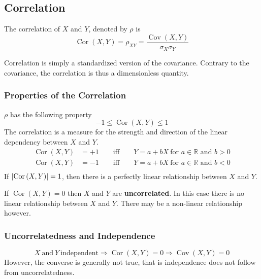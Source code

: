 \documentclass[11pt]{article}
\theoremstyle{definition}
\newcommand*\R{\mathbb{R}}
\newcommand*\Cov[1]{\mathop{\text{Cov}}\left(#1\right)}
\newcommand*\Cor[1]{\mathop{\text{Cor}}\left(#1\right)}
\DeclarePairedDelimiter\abs{\lvert}{\rvert}
\begin{document}
\subsection{Correlation}
\begin{definition}
	The correlation of $X$ and $Y$, denoted by $\rho$ is
	\begin{equation*}
		\Cor{X,Y} = \rho_{XY} = \frac{\Cov{X,Y}}{\sigma_X\sigma_Y}
	\end{equation*}
\end{definition}
Correlation is simply a standardized version of the covariance. Contrary to the covariance, the correlation is thus a dimensionless quantity. 

\subsubsection{Properties of the Correlation}
$\rho$ has the following property
\begin{equation*}
	-1 \leq \Cor{X,Y} \leq 1
\end{equation*}
The correlation is a measure for the strength and direction of the linear dependency between $X$ and $Y$.
\begin{align*}
	\Cor{X,Y} &= +1 \qquad\text{iff}\qquad Y=a+bX\ \text{for $a\in\R$ and $b>0$}\\
	\Cor{X,Y} &= -1 \qquad\text{iff}\qquad Y=a+bX\ \text{for $a\in\R$ and $b<0$}\\
\end{align*}
If $\abs{\Cor{X,Y}} = 1$, then there is a perfectly linear relationship between $X$ and $Y$.

\begin{definition}
	If $\Cor{X,Y}=0$ then $X$ and $Y$ are \textbf{uncorrelated}. In this case there is no linear relationship between $X$ and $Y$. There may be a non-linear relationship however.
\end{definition}

\subsubsection{Uncorrelatedness and Independence}
\begin{equation*}
	X\ \text{and}\ Y\ \text{independent} \Rightarrow \Cor{X,Y}=0\Rightarrow \Cov{X,Y}=0
\end{equation*}
However, the converse is generally not true, that is independence does not follow from uncorrelatedness.
\end{document}
